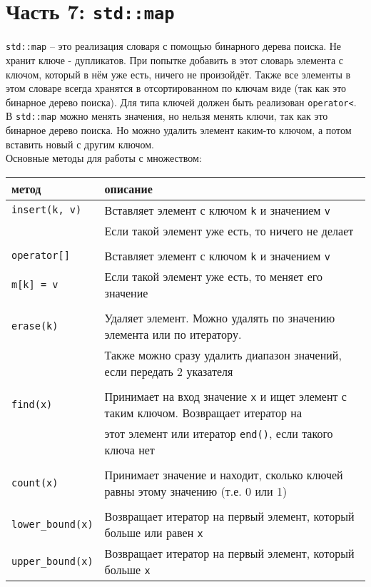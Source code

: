 \documentclass{article}
\begin{document}
\newpage
\section*{Часть 7: \texttt{std::map}}
\texttt{std::map} -- это реализация словаря с помощью бинарного дерева поиска. Не хранит ключе - дупликатов. При попытке добавить в этот словарь элемента с ключом, который в нём уже есть, ничего не произойдёт. Также все элементы в этом словаре всегда хранятся в отсортированном по ключам виде (так как это бинарное дерево поиска). Для типа ключей должен быть реализован \texttt{operator<}. В \texttt{std::map} можно менять значения, но нельзя менять ключи, так как это бинарное дерево поиска. Но можно удалить элемент каким-то ключом, а потом вставить новый с другим ключом.\\

Основные методы для работы с множеством:
\begin{center}
\begin{tabular}{ l | l }
 метод & описание \\ \hline
 \texttt{insert(k, v)}  & Вставляет элемент с ключом \texttt{k} и значением \texttt{v}\\
                        & Если такой элемент уже есть, то ничего не делает \\ \\\hline
 \texttt{operator[]}    &  Вставляет элемент с ключом \texttt{k} и значением \texttt{v}\\
 \texttt{m[k] = v}      & Если такой элемент уже есть, то меняет его значение \\ \\\hline
 \texttt{erase(k)}      & Удаляет элемент. Можно удалять по значению элемента или по итератору.  \\ 
                        & Также можно сразу удалить диапазон значений, если передать 2 указателя \\\\ \hline
 \texttt{find(x)}       & Принимает на вход значение \texttt{x} и ищет элемент с таким ключом. Возвращает итератор на \\
                        &  этот элемент или итератор \texttt{end()}, если такого ключа нет\\ \\ \hline
 \texttt{count(x)}      & Принимает значение и находит, сколько ключей равны этому значению (т.е. 0 или 1) \\ \\\hline
 \texttt{lower\_bound(x)}  & Возвращает итератор на первый элемент, который больше или равен \texttt{x} \\
 \texttt{upper\_bound(x)}  & Возвращает итератор на первый элемент, который больше \texttt{x} \\
\end{tabular}
\end{center}
\end{document}
